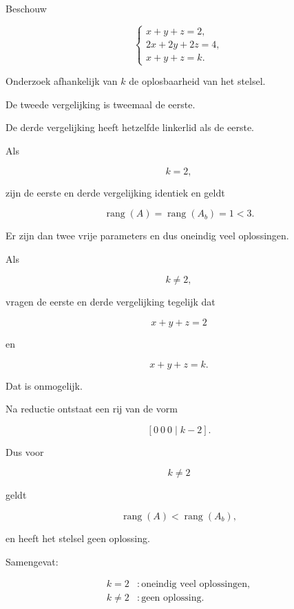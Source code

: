 \documentclass{ximera}
\begin{document}
\begin{oefening}{\oefG}

Beschouw

\[
\begin{cases}
x+y+z=2,\\
2x+2y+2z=4,\\
x+y+z=k.
\end{cases}
\]

Onderzoek afhankelijk van \(k\) de oplosbaarheid van het stelsel.

\begin{oplossing}

De tweede vergelijking is tweemaal de eerste.

De derde vergelijking heeft hetzelfde linkerlid als de eerste.

Als

\[
k=2,
\]

zijn de eerste en derde vergelijking identiek en geldt

\[
\operatorname{rang}(A)
=
\operatorname{rang}(A_b)
=
1<3.
\]

Er zijn dan twee vrije parameters en dus oneindig veel oplossingen.

Als

\[
k\neq2,
\]

vragen de eerste en derde vergelijking tegelijk dat

\[
x+y+z=2
\]

en

\[
x+y+z=k.
\]

Dat is onmogelijk.

Na reductie ontstaat een rij van de vorm

\[
[0\ 0\ 0\mid k-2].
\]

Dus voor

\[
k\neq2
\]

geldt

\[
\operatorname{rang}(A)
<
\operatorname{rang}(A_b),
\]

en heeft het stelsel geen oplossing.

Samengevat:

\[
\boxed{
\begin{array}{ll}
k=2 &: \text{oneindig veel oplossingen},\\[1mm]
k\neq2 &: \text{geen oplossing}.
\end{array}
}
\]

\end{oplossing}

\end{oefening}
\end{document}
